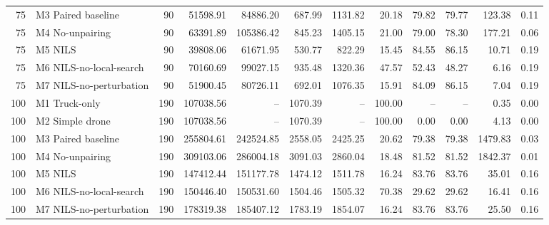 \begin{tabular}{rlrrrrrrrrrr}
75 & M3 Paired baseline & 90 & 51598.91 & 84886.20 & 687.99 & 1131.82 & 20.18 & 79.82 & 79.77 & 123.38 & 0.11 \\
75 & M4 No-unpairing & 90 & 63391.89 & 105386.42 & 845.23 & 1405.15 & 21.00 & 79.00 & 78.30 & 177.21 & 0.06 \\
75 & M5 NILS & 90 & 39808.06 & 61671.95 & 530.77 & 822.29 & 15.45 & 84.55 & 86.15 & 10.71 & 0.19 \\
75 & M6 NILS-no-local-search & 90 & 70160.69 & 99027.15 & 935.48 & 1320.36 & 47.57 & 52.43 & 48.27 & 6.16 & 0.19 \\
75 & M7 NILS-no-perturbation & 90 & 51900.45 & 80726.11 & 692.01 & 1076.35 & 15.91 & 84.09 & 86.15 & 7.04 & 0.19 \\
100 & M1 Truck-only & 190 & 107038.56 & -- & 1070.39 & -- & 100.00 & -- & -- & 0.35 & 0.00 \\
100 & M2 Simple drone & 190 & 107038.56 & -- & 1070.39 & -- & 100.00 & 0.00 & 0.00 & 4.13 & 0.00 \\
100 & M3 Paired baseline & 190 & 255804.61 & 242524.85 & 2558.05 & 2425.25 & 20.62 & 79.38 & 79.38 & 1479.83 & 0.03 \\
100 & M4 No-unpairing & 190 & 309103.06 & 286004.18 & 3091.03 & 2860.04 & 18.48 & 81.52 & 81.52 & 1842.37 & 0.01 \\
100 & M5 NILS & 190 & 147412.44 & 151177.78 & 1474.12 & 1511.78 & 16.24 & 83.76 & 83.76 & 35.01 & 0.16 \\
100 & M6 NILS-no-local-search & 190 & 150446.40 & 150531.60 & 1504.46 & 1505.32 & 70.38 & 29.62 & 29.62 & 16.41 & 0.16 \\
100 & M7 NILS-no-perturbation & 190 & 178319.38 & 185407.12 & 1783.19 & 1854.07 & 16.24 & 83.76 & 83.76 & 25.50 & 0.16 \\
\bottomrule
\end{tabular}
